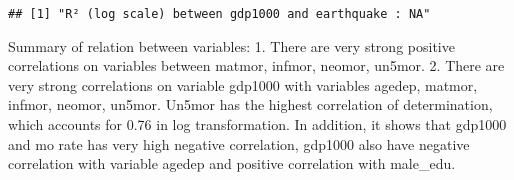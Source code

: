 \documentclass[
]{article}
\begin{document}
\begin{verbatim}
## [1] "R² (log scale) between gdp1000 and earthquake : NA"
\end{verbatim}

Summary of relation between variables: 1. There are very strong positive
correlations on variables between matmor, infmor, neomor, un5mor. 2.
There are very strong correlations on variable gdp1000 with variables
agedep, matmor, infmor, neomor, un5mor. Un5mor has the highest
correlation of determination, which accounts for 0.76 in log
transformation. In addition, it shows that gdp1000 and mo rate has very
high negative correlation, gdp1000 also have negative correlation with
variable agedep and positive correlation with male\_edu.
\end{document}
